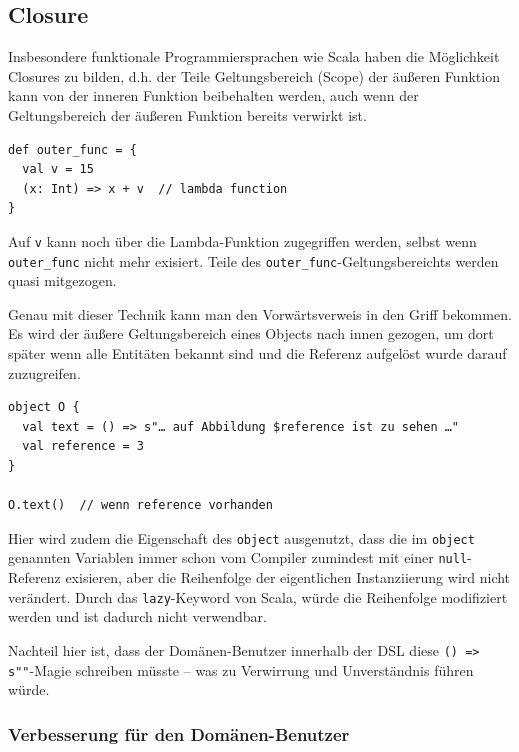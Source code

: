 

\subsection{Closure}

Insbesondere funktionale Programmiersprachen wie Scala haben die
Möglichkeit Closures zu bilden, d.h. der Teile Geltungsbereich (Scope)
der äußeren Funktion  kann von der inneren Funktion beibehalten werden,
auch wenn der Geltungsbereich der äußeren Funktion bereits verwirkt ist.

\begin{lstlisting}
def outer_func = {
  val v = 15
  (x: Int) => x + v  // lambda function
}
\end{lstlisting}

Auf \lstinline|v| kann noch über die Lambda-Funktion zugegriffen werden,
selbst wenn \lstinline|outer_func| nicht mehr exisiert. Teile des
\lstinline|outer_func|-Geltungsbereichts werden quasi mitgezogen.

Genau mit dieser Technik kann man den Vorwärtsverweis in den Griff bekommen.
Es wird der äußere Geltungsbereich eines Objects nach innen gezogen,
um dort später wenn alle Entitäten bekannt sind und die Referenz aufgelöst
wurde darauf zuzugreifen.

\begin{lstlisting}
object O {
  val text = () => s"… auf Abbildung $reference ist zu sehen …"
  val reference = 3
}

O.text()  // wenn reference vorhanden
\end{lstlisting}

Hier wird zudem die Eigenschaft des \lstinline|object| ausgenutzt,
dass die im \lstinline|object| genannten Variablen immer schon vom Compiler
zumindest mit einer \lstinline|null|-Referenz exisieren, aber die Reihenfolge
der eigentlichen Instanziierung wird nicht verändert. Durch das
\lstinline|lazy|-Keyword von Scala, würde die Reihenfolge modifiziert werden
und ist dadurch nicht verwendbar.

Nachteil hier ist, dass der Domänen-Benutzer innerhalb der DSL diese
\lstinline|() => s""|-Magie schreiben müsste -- was zu Verwirrung und
Unverständnis führen würde.


\subsubsection{Verbesserung für den Domänen-Benutzer}

